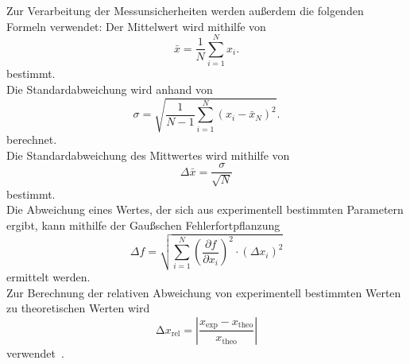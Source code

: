 \label{sec:fehlerrechnung}
Zur Verarbeitung der Messunsicherheiten werden außerdem die folgenden Formeln verwendet: 
Der Mittelwert wird mithilfe von
\begin{equation}
\bar{x} = \frac{1}{N} \sum_{i=1}^{N} x_i.
\label{eqn:mittelwert}
\end{equation}
bestimmt.
\\
Die Standardabweichung wird anhand von
\begin{equation}
\sigma = \sqrt{\frac{1}{N - 1} \sum_{i=1}^{N} \left( x_i - \bar{x}_N \right)^2}.
\label{eqn:standardabweichung}
\end{equation}
berechnet.
\\
Die Standardabweichung des Mittwertes wird mithilfe von 
\begin{equation}
\Delta \bar{x} = \frac{\sigma}{\sqrt{N}}
\label{eqn:standardmittelwert}
\end{equation}
bestimmt.
\\
Die Abweichung eines Wertes, der sich aus experimentell bestimmten Parametern ergibt, kann mithilfe der Gaußschen Fehlerfortpflanzung 
\begin{equation}
\Delta f = \sqrt{\sum_{i=1}^{N} \left( \frac{\partial f}{\partial x_i} \right)^2 \cdot (\Delta x_i)^2}
\label{eqn:fehlerfortpflanzung}
\end{equation}
ermittelt werden.
\\
Zur Berechnung der relativen Abweichung von experimentell bestimmten Werten zu theoretischen Werten wird 
\begin{equation}
    \increment x_{\mathrm{rel}} = \left| \frac{x_{\mathrm{\exp}}-x_{\mathrm{theo}}}{x_{\mathrm{theo}}}\right|
    \label{eqn:relabw}
\end{equation}
verwendet~\cite{relabw}. 

